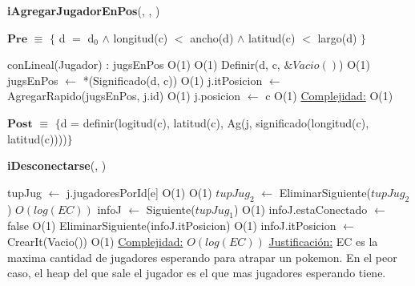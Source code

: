 \begin{algorithm}[H]{\textbf{iAgregarJugadorEnPos}(, , )} 

$\textbf{Pre}$ $\equiv$ $\{$ d $=$ d$_0$ $\land$ longitud(c) $<$ ancho(d) $\land$ latitud(c) $<$ largo(d) $\}$
  \begin{algorithmic}
      \State conLineal(Jugador) : jugsEnPos \Comment O(1)
      	\Comment O(1)
          \State Definir(d, c, $\&Vacio()$) \Comment O(1)
      \EndIf
      \State jugsEnPos $\gets$ *(Significado(d, c)) \Comment O(1)
      \State j.itPosicion $\gets$ AgregarRapido(jugsEnPos, j.id) \Comment O(1)
      \State j.posicion $\gets$ c \Comment O(1)
		\Statex \underline{Complejidad:} O(1) 
    \end{algorithmic}
$\textbf{Post}$ $\equiv$ $\{$d = definir(logitud(c), latitud(c), Ag(j, significado(longitud(c), latitud(c))))$\}$
\end{algorithm}

\begin{algorithm}[H]{\textbf{iDesconectarse}(, )} 
	\begin{algorithmic}
		\State tupJug $\gets$ j.jugadoresPorId[e]	\Comment O(1)
			\Comment O(1)
			\State $tupJug_{2}$ $\gets$ EliminarSiguiente($tupJug_{2}$)	\Comment $O(log(EC))$
		\EndIf
    \State infoJ $\gets$ Siguiente($tupJug_{1}$) \Comment O(1) 
		\State infoJ.estaConectado $\gets$ false	\Comment O(1)
    \State EliminarSiguiente(infoJ.itPosicion) \Comment O(1)
    \State infoJ.itPosicion $\gets$ CrearIt(Vacio())	\Comment O(1)
		\medskip
		\Statex \underline{Complejidad:} $O(log(EC))$
		\Statex \underline{Justificación:} EC es la maxima cantidad de jugadores esperando para atrapar un pokemon. En el peor caso, el heap del que sale el jugador es el que mas jugadores esperando tiene.
    \end{algorithmic}
\end{algorithm}

